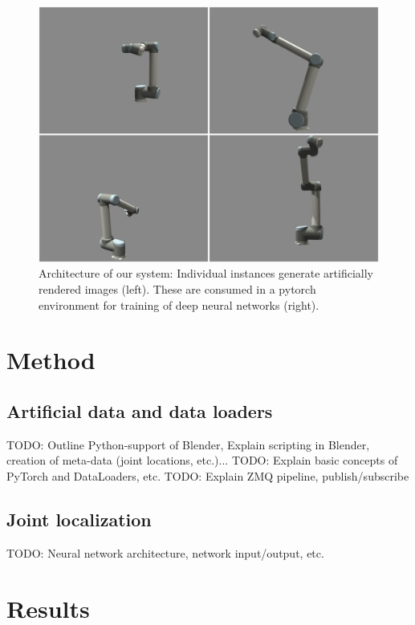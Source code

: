\documentclass[conference]{IEEEtran}
\begin{document}
\begin{figure}[htbp]
\centerline{\includegraphics[width=\columnwidth]{figures/examplesUR10/renderedImages.png}}
\caption{\label{fig:architecture} Architecture of our system: Individual instances generate artificially rendered images (left). These are consumed in a pytorch environment for training of deep neural networks (right).}
\label{fig}
\end{figure}


\section{Method}

\subsection{Artificial data and data loaders}

TODO: Outline Python-support of Blender, Explain scripting in Blender, creation of meta-data (joint locations, etc.)...
TODO: Explain basic concepts of PyTorch and DataLoaders, etc.
TODO: Explain ZMQ pipeline, publish/subscribe

\subsection{Joint localization}

TODO: Neural network architecture, network input/output, etc.

\section{Results}
\end{document}

